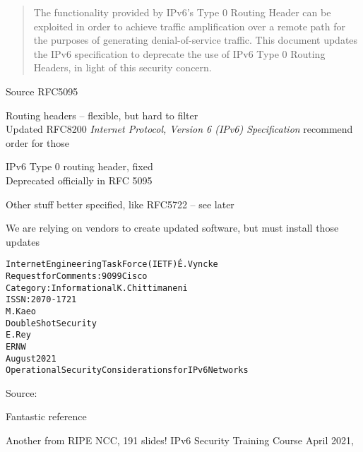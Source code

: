 \documentclass[Screen16to9,17pt]{foils}
\begin{document}


\begin{quote}
The functionality provided by IPv6's Type 0 Routing Header can be exploited in order to achieve traffic amplification over a remote path for the purposes of generating denial-of-service traffic.  This document updates the IPv6 specification to deprecate the use of IPv6 Type 0 Routing Headers, in light of this security concern.
\end{quote}
Source RFC5095


\begin{list2}
\item Routing headers -- flexible, but hard to filter\\
Updated RFC8200 \emph{Internet Protocol, Version 6 (IPv6) Specification} recommend order for those
\item IPv6 Type 0 routing header, fixed\\
Deprecated officially in RFC 5095 
\item Other stuff better specified, like RFC5722 -- see later
\end{list2}

We are relying on vendors to create updated software, but must install those updates




\begin{alltt}\small
Internet Engineering Task Force (IETF)                         É. Vyncke
Request for Comments: 9099                                         Cisco
Category: Informational                                  K. Chittimaneni
ISSN: 2070-1721
                                                                 M. Kaeo
                                                    Double Shot Security
                                                                  E. Rey
                                                                    ERNW
                                                             August 2021
         Operational Security Considerations for IPv6 Networks
\end{alltt}
Source: 

\begin{list2}
\item Fantastic reference
\item Another from RIPE NCC, 191 slides! IPv6 Security Training Course April 2021,\\
\end{list2}
\end{document}
